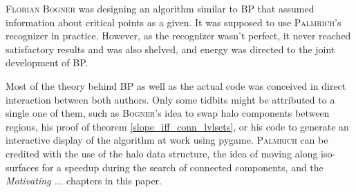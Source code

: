 \documentclass[a4paper,12pt,notitlepage,fullpage]{paper}
\theoremstyle{plain}
\theoremstyle{definition}
\begin{document}
\textsc{Florian Bogner} was designing an algorithm similar to BP that assumed information about critical points as a given. It was supposed to use \textsc{Palmrich}'s recognizer in practice. However, as the recognizer wasn't perfect, it never reached satisfactory results and was also shelved, and energy was directed to the joint development of BP.

Most of the theory behind BP as well as the actual code was conceived in direct interaction between both authors. Only some tidbits might be attributed to a single one of them, such as \textsc{Bogner}'s idea to swap halo components between regions, his proof of theorem \ref{slope_iff_conn_lvlsets}, or his code to generate an interactive display of the algorithm at work using pygame. \textsc{Palmrich} can be credited with the use of the halo data structure, the idea of moving along iso-surfaces for a speedup during the search of connected components, and the \emph{Motivating ...} chapters in this paper.




\end{document}
